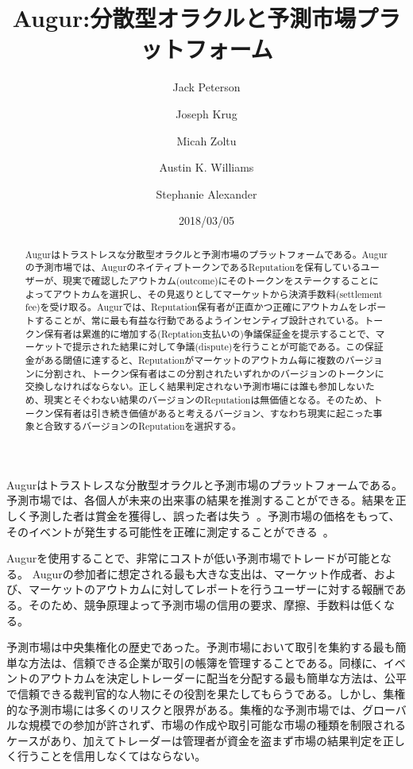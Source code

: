 \documentclass[floatfix,reprint,nofootinbib,amsmath,amssymb,epsfig,pre,floats,letterpaper,groupedaffiliation]{revtex4-1}
\theoremstyle{definition}
\theoremstyle{definition}
\theoremstyle{definition}
\begin{document}
\title{Augur:分散型オラクルと予測市場プラットフォーム}

\author{Jack Peterson}
\author{Joseph Krug}
\author{Micah Zoltu}
\author{Austin K. Williams}
\author{Stephanie Alexander}

\date{2018/03/05}

\begin{abstract}
Augurはトラストレスな分散型オラクルと予測市場のプラットフォームである。Augurの予測市場では、AugurのネイティブトークンであるReputationを保有しているユーザーが、現実で確認したアウトカム(outcome)にそのトークンをステークすることによってアウトカムを選択し、その見返りとしてマーケットから決済手数料(settlement fee)を受け取る。Augurでは、Reputation保有者が正直かつ正確にアウトカムをレポートすることが、常に最も有益な行動であるようインセンティブ設計されている。トークン保有者は累進的に増加する(Reptation支払いの)争議保証金を提示することで、マーケットで提示された結果に対して争議(dispute)を行うことが可能である。この保証金がある閾値に達すると、Reputationがマーケットのアウトカム毎に複数のバージョンに分割され、トークン保有者はこの分割されたいずれかのバージョンのトークンに交換しなければならない。正しく結果判定されない予測市場には誰も参加しないため、現実とそぐわない結果のバージョンのReputationは無価値となる。そのため、トークン保有者は引き続き価値があると考えるバージョン、すなわち現実に起こった事象と合致するバージョンのReputationを選択する。
\end{abstract}

\maketitle

Augurはトラストレスな分散型オラクルと予測市場のプラットフォームである。予測市場では、各個人が未来の出来事の結果を推測することができる。結果を正しく予測した者は賞金を獲得し、誤った者は失う~\cite{Wolfers_2004, Surowiecki_2005, Hanson_2006}。予測市場の価格をもって、そのイベントが発生する可能性を正確に測定することができる~\cite{Pennock_2001, Manski_2004, Wolfers_2005, Goel_2010}。

Augurを使用することで、非常にコストが低い予測市場でトレードが可能となる。 Augurの参加者に想定される最も大きな支出は、マーケット作成者、および、マーケットのアウトカムに対してレポートを行うユーザーに対する報酬である。そのため、競争原理よって予測市場の信用の要求、摩擦、手数料は低くなる。

予測市場は中央集権化の歴史であった。予測市場において取引を集約する最も簡単な方法は、信頼できる企業が取引の帳簿を管理することである。同様に、イベントのアウトカムを決定しトレーダーに配当を分配する最も簡単な方法は、公平で信頼できる裁判官的な人物にその役割を果たしてもらうである。しかし、集権的な予測市場には多くのリスクと限界がある。集権的な予測市場では、グローバルな規模での参加が許されず、市場の作成や取引可能な市場の種類を制限されるケースがあり、加えてトレーダーは管理者が資金を盗まず市場の結果判定を正しく行うことを信用しなくてはならない。
\end{document}
